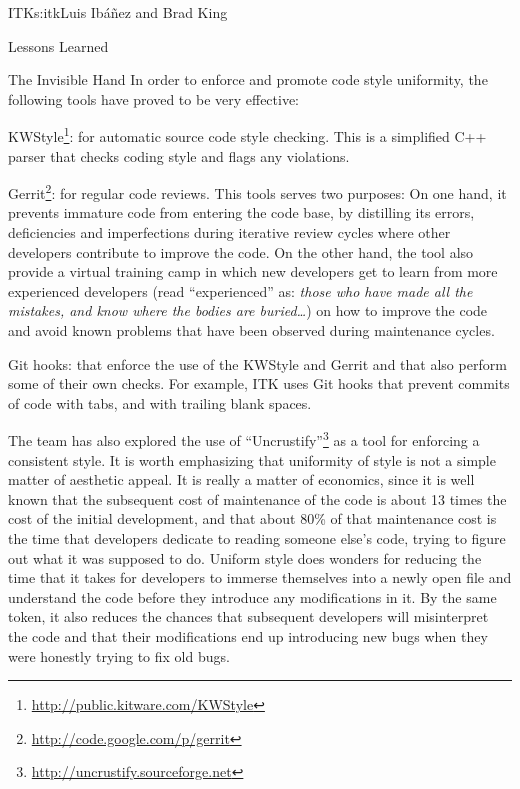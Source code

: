 \begin{aosachapter}{ITK}{s:itk}{Luis Ib\'{a}\~{n}ez and Brad King}
\begin{aosasect1}{Lessons Learned}
\begin{aosasect2}{The Invisible Hand}
In order to enforce and promote code style uniformity, the following tools have
proved to be very effective:

\begin{aosaitemize}
\item KWStyle\footnote{\url{http://public.kitware.com/KWStyle}}: for automatic
source code style checking. This is a simplified C++ parser that checks coding style and
flags any violations.
\item Gerrit\footnote{\url{http://code.google.com/p/gerrit}}: for regular code
reviews. This tools serves two purposes: On one hand, it prevents immature
code from entering the code base, by distilling its errors, deficiencies and
imperfections during iterative review cycles where other developers contribute
to improve the code. On the other hand, the tool also provide a virtual
training camp in which new developers get to learn from more experienced
developers (read ``experienced'' as: \emph{those who have made all the
mistakes, and know where the bodies are buried\ldots}) on how to improve the
code and avoid known problems that have been observed during maintenance
cycles.
\item Git hooks: that enforce the use of the KWStyle and Gerrit and that also
perform some of their own checks. For example, ITK uses Git hooks that prevent
commits of code with tabs, and with trailing blank spaces.
\end{aosaitemize}

The team has also explored the use of
``Uncrustify''\footnote{\url{http://uncrustify.sourceforge.net}} as a tool for
enforcing a consistent style. It is worth emphasizing that uniformity of style
is not a simple matter of aesthetic appeal. It is really a matter of economics,
since it is well known that the subsequent cost of maintenance of the code is
about 13 times the cost of the initial development, and that about 80\% of that
maintenance cost is the time that developers dedicate to reading someone else's
code, trying to figure out what it was supposed to do. Uniform style does
wonders for reducing the time that it takes for developers to immerse
themselves into a newly open file and understand the code before they
introduce any modifications in it. By the same token, it also reduces the
chances that subsequent developers will misinterpret the code and that their
modifications end up introducing new bugs when they were honestly trying to fix
old bugs.


\end{aosasect2}
\end{aosasect1}
\end{aosachapter}
